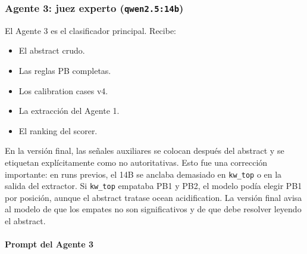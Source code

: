 \subsubsection{Agente 3: juez experto (\texttt{qwen2.5:14b})}

El Agente 3 es el clasificador principal. Recibe:

\begin{itemize}
\item El abstract crudo.
\item Las reglas PB completas.
\item Los calibration cases v4.
\item La extracción del Agente 1.
\item El ranking del scorer.
\end{itemize}

En la versión final, las señales auxiliares se colocan después del abstract y se etiquetan explícitamente como no autoritativas. Esto fue una corrección importante: en runs previos, el 14B se anclaba demasiado en \texttt{kw\_top} o en la salida del extractor. Si \texttt{kw\_top} empataba PB1 y PB2, el modelo podía elegir PB1 por posición, aunque el abstract tratase ocean acidification. La versión final avisa al modelo de que los empates no son significativos y de que debe resolver leyendo el abstract.

\paragraph{Prompt del Agente 3}

